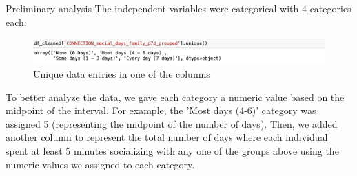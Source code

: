 \documentclass{beamer}
\begin{document}
\begin{frame}{Preliminary analysis}
    The independent variables were categorical with 4 categories each: 
\begin{figure}
    \centering
    \includegraphics[width=1\linewidth]{image2.png}
    \caption{Unique data entries in one of the columns }
    \end{figure}
    To better analyze the data, we gave each category a numeric value based on the midpoint of the interval. For example, the 'Most days (4-6)' category was assigned 5 (representing the midpoint of the number of days). Then, we added another column to represent the total number of days where each individual spent at least 5 minutes socializing with any one of the groups above using the numeric values we assigned to each category. 
\end{frame}
\end{document}
